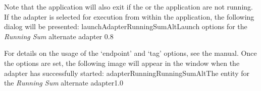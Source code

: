 Note that the application will also exit if the  or the
 application are not running.
\condPage{}
If the adapter is selected for execution from within the \emph{\CMU} application, the
following dialog will be presented:
%
{launchAdapterRunningSumAlt}{Launch options for the \emph{Running Sum} alternate adapter}%
{0.8}

For details on the usage of the `endpoint' and `tag' options, see the \emph{\CMU} manual.
Once the options are set, the following image will appear in the \emph{\CMU} window when
the adapter has successfully started:
%
{adapterRunningRunningSumAlt}{The \emph{\CMU} entity for the \emph{Running Sum} alternate
adapter}{1.0}
\secondaryEnd
\appendixEnd{}
